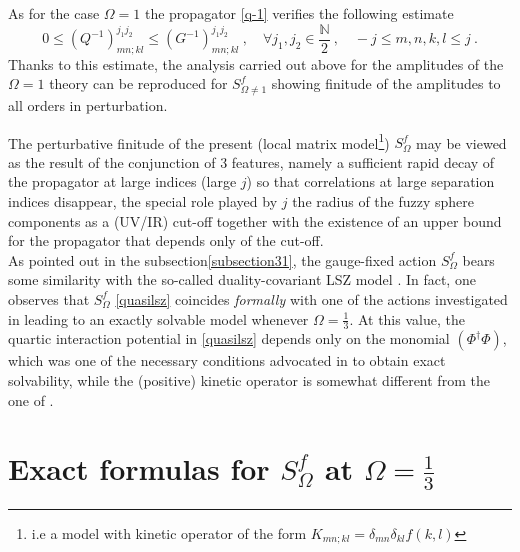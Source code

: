 \documentclass[a4paper,11pt,twoside]{article}
\numberwithin{equation}{section}
\theoremstyle{nonumberplain}
\begin{document}
As for the case $\Omega=1$ the propagator \eqref{q-1} verifies the following estimate%
%
\begin{equation}
0\le (Q^{-1})^{j_1j_2}_{mn;kl}\le(G^{-1})^{j_1j_2}_{mn;kl} \ , \quad \forall j_1,j_2\in\frac{\mathbb{N}}{2} \ , \quad -j\le m,n,k,l\le j \ . \label{envelop-number2}
\end{equation}
%
Thanks to this estimate, the analysis carried out above for the amplitudes of the $\Omega=1$ theory can be reproduced for $S^f_{\Omega\ne1}$ showing finitude of the amplitudes to all orders in perturbation.\par%
%
The perturbative finitude of the present (local matrix model{\footnote{i.e a model with kinetic operator of the form $K_{mn;kl}=\delta_{mn}\delta_{kl}f(k,l)$ }}) $S^f_{\Omega}$ may be viewed as the result of the conjunction of 3 features, namely a sufficient rapid decay of the propagator at large indices (large $j$) so that correlations at large separation indices disappear, the special role played by $j$ the radius of the fuzzy sphere components as a (UV/IR) cut-off together with the existence of an upper bound for the propagator that depends only of the cut-off.\\
As pointed out in the subsection\ref{subsection31}, the gauge-fixed action $S^f_{\Omega}$ bears some similarity with the so-called duality-covariant LSZ model \cite{LSZ}. In fact, one observes that $S^f_{\Omega}$ \eqref{quasilsz} coincides {\it{formally}} with one of the actions investigated in \cite{LSZ} leading to an exactly solvable model whenever $\Omega=\frac{1}{3}$. At this value, the quartic interaction potential in \eqref{quasilsz} depends only on the monomial $(\Phi^\dag\Phi)$, which was one of the necessary conditions advocated in \cite{LSZ} to obtain exact solvability, while the (positive) kinetic operator is somewhat different from the one of \cite{LSZ}.%


\section{\texorpdfstring{Exact formulas for $S^f_\Omega$ at $\Omega=\frac{1}{3}$}{Exact formulas}}\label{section4}
\end{document}
